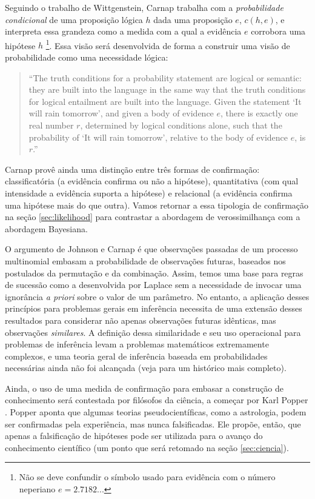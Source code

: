 Seguindo o trabalho de Wittgenstein, Carnap trabalha 
com a {\em probabilidade condicional} de uma proposição lógica $h$ dada uma proposição $e$, $c(h, e)$, 
e interpreta essa grandeza como a medida com a qual a evidência $e$ corrobora uma hipótese $h$ \citep{Zabell09}\footnote{Não se deve confundir o símbolo usado para evidência com o número neperiano $e = 2.7182...$}.
Essa visão será desenvolvida de forma a construir uma visão de probabilidade como uma necessidade lógica:

\begin{quote}
``The truth conditions for a probability statement are logical or semantic: they are built into the language in the same
way that the truth conditions for logical entailment are built into the language. Given the statement `It will rain tomorrow',
and given a body of evidence $e$, there is exactly one real number $r$, determined by logical conditions alone, such
that the probability of `It will rain tomorrow', relative to the body of evidence $e$, is $r$.'' \citep{Kyburg74}
\end{quote}

Carnap provê ainda uma distinção entre três formas de confirmação: classificatória (a evidência confirma ou não a hipótese),
quantitativa (com qual intensidade a evidência suporta a hipótese) e relacional (a evidência confirma uma hipótese mais do que
outra)\citep{Carnap62}. Vamos retornar a essa tipologia de confirmação na seção \ref{sec:likelihood} para contrastar
a abordagem de verossimilhança com a abordagem Bayesiana.

O argumento de Johnson e Carnap é que observações passadas de um processo multinomial embasam a probabilidade
de observações futuras, baseados nos postulados da permutação e da combinação. 
Assim, temos uma base para regras de sucessão como a 
desenvolvida por Laplace sem a necessidade de invocar uma ignorância {\em a priori} sobre o valor de um parâmetro. 
No entanto, a aplicação desses princípios para problemas gerais em inferência necessita de uma extensão desses resultados
para considerar não apenas observações futuras idênticas, mas observações {\em similares}. A definição dessa similaridade
e seu uso operacional para problemas de inferência levam a problemas matemáticos extremamente complexos, e uma teoria
geral de inferência baseada em probabilidades necessárias ainda não foi alcançada (veja \cite{Zabell09} para um histórico
mais completo).

Ainda, o uso de uma medida de confirmação para embasar a construção de conhecimento será contestada por filósofos
da ciência, a começar por Karl Popper \citep{Popper63}. Popper aponta que algumas teorias pseudocientíficas, como
a astrologia, podem ser confirmadas pela experiência, mas nunca falsificadas. Ele propõe, então, que apenas a 
falsificação de hipóteses pode ser utilizada para o avanço do conhecimento científico (um ponto que será retomado
na seção \ref{sec:ciencia}).

